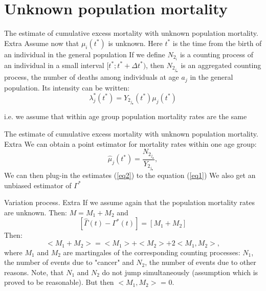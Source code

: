\documentclass{beamer}
\begin{document}
\section{Unknown population mortality}
\begin{frame}{The estimate of cumulative excess mortality with unknown population mortality. Extra}
Assume now that $\mu_i(t^*)$ is unknown. Here $t^*$ is the time from the birth of an individual in the general population
\newline
If we define $N_{2_i}$ is a counting process of an individual in a small interval $[t^*; t^*+\Delta t^*)$, then $N_{2_j_\bullet}$ is an aggregated counting process, the number of deaths among individuals at age $a_j$ in the general population.
\newline
\newline
Its intensity can be written:
$$\lambda^*_j(t^*)=Y_{2_j_\bullet}(t^*)\mu_j(t^*)$$

i.e. we assume that within age group population mortality rates are the same
\end{frame}


\begin{frame}{The estimate of cumulative excess mortality with unknown population mortality. Extra}
We can obtain a point estimator for mortality rates within one age group:
\begin{equation}
\label{eq2}
    \hat \mu_j(t^*) = \frac{N_2_j_{\bullet}}{Y_2_j_{\bullet}},
\end{equation}
 \newline
 \newline
We can then plug-in the estimates (\ref{eq2}) to the equation (\ref{eq1}) 
\newline
We also get an unbiased estimator of $\Gamma^*$
\end{frame}

\begin{frame}{Variation process. Extra}
If we assume again that the population mortality rates are unknown. Then: $M = M_1 + M_2$ and 
$$[\hat\Gamma(t) - \Gamma^*(t)] = [M_1 + M_2]$$
Then:
$$<M_1 + M_2> = <M_1> + <M_2> + 2<M_1,M_2>, $$
where $M_1$ and $M_2$ are martingales of the corresponding counting processes: $N_1$, the number of events due to "cancer" and $N_2$, the number of events due to other reasons.  
\newline
Note, that $N_1$ and $N_2$ do not jump simultaneously (assumption which is proved to be reasonable). But then $<M_1,M_2>$ = 0. 
\end{frame}
\end{document}

